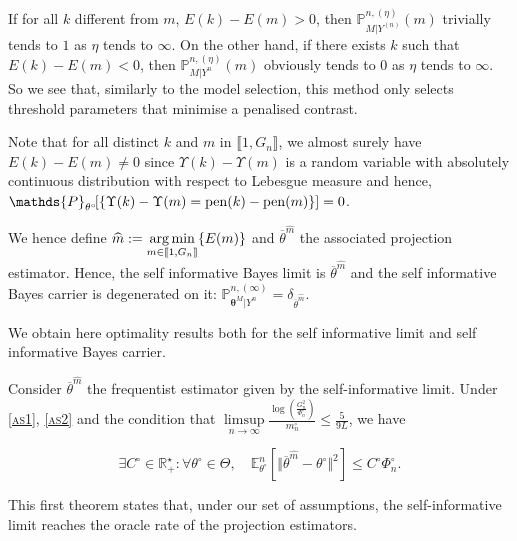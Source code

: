 \medskip

If for all $k$ different from $m$, $E(k) - E(m) > 0$, then $\mathds{P}_{M\vert Y^{(n)}}^{n,(\eta)}(m)$ trivially tends to $1$ as $\eta$ tends to $\infty$. On the other hand, if there exists $k$ such that $E(k) - E(m) < 0$,  then $\mathds{P}_{M\vert Y^{n}}^{n, (\eta)}(m)$ obviously tends to $0$ as $\eta$ tends to $\infty$. So we see that, similarly to the model selection, this method only selects threshold parameters that minimise a penalised contrast.

\medskip

Note that for all distinct $k$ and $m$ in $\llbracket 1, G_{n} \rrbracket$, we almost surely have $E(k) - E(m) \neq 0$ since $\Upsilon(k) - \Upsilon(m)$ is a random variable with absolutely continuous distribution with respect to Lebesgue measure and hence, $\mathds{P}_{\theta^{\circ}}\!\!\left[\{\Upsilon(k) - \Upsilon(m) = \pen(k) - \pen(m)\}\right] = 0$.

We hence define $\widehat{m} := \operatorname*{arg\,min}\limits_{m \in \llbracket 1, G_{n} \rrbracket}\{E(m)\}$ and $\overline{\theta}^{\widehat{m}}$ the associated projection estimator. Hence, the self informative Bayes limit is $\overline{\theta}^{\widehat{m}}$ and the self informative Bayes carrier is degenerated on it: $\mathds{P}_{\boldsymbol{\theta}^{M} \vert Y^{n}}^{n, (\infty)} = \delta_{\overline{\theta}^{\widehat{m}}}$.

\medskip

We obtain here optimality results both for the self informative limit and self informative Bayes carrier.

\begin{thm}\label{thm3}
Consider $\overline{\theta}^{\widehat{m}}$ the frequentist estimator given by the self-informative limit.
Under \textsc{\cref{as1}}, \textsc{\cref{as2}} and the condition that $\limsup\limits_{n \rightarrow \infty}\frac{\log\left(\frac{G_{n}^{2}}{\Phi_{n}^{\circ}}\right)}{m_{n}^{\circ}} \leq \frac{5}{9 L}$, we have

\[\exists C^{\circ} \in \mathds{R}_{+}^{\star} : \forall \theta^{\circ} \in \Theta, \quad \mathds{E}_{\theta^{\circ}}^{n}\left[\Vert \overline{\theta}^{\widehat{m}} - \theta^{\circ} \Vert^{2}\right] \leq C^{\circ} \Phi_{n}^{\circ}.\]
\end{thm}

This first theorem states that, under our set of assumptions, the self-informative limit reaches the oracle rate of the projection estimators.

